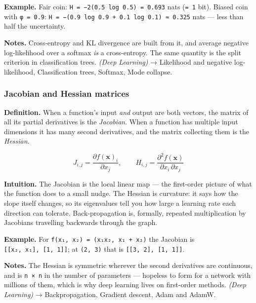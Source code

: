 \documentclass[
  10pt,
  letterpaper,
  onecolumn]{article}
\begin{document}
\textbf{Example.} Fair coin:
\texttt{H\ =\ −2(0.5\ log\ 0.5)\ =\ 0.693} nats
(\texttt{=\ 1} bit). Biased coin with \texttt{φ\ =\ 0.9}:
\texttt{H\ =\ −(0.9\ log\ 0.9\ +\ 0.1\ log\ 0.1)\ ≈\ 0.325} nats ---
less than half the uncertainty.

\textbf{Notes.} Cross-entropy and KL divergence are built from it, and
average negative log-likelihood over a softmax \emph{is} a
cross-entropy. The same quantity is the split criterion in
classification trees. \emph{(Deep Learning)} → Likelihood and negative
log-likelihood, Classification trees, Softmax, Mode collapse.

\hypertarget{jacobian-and-hessian-matrices}{%
\subsubsection{Jacobian and Hessian
matrices}\label{jacobian-and-hessian-matrices}}

\textbf{Definition.} When a function's input \emph{and} output are both
vectors, the matrix of all its partial derivatives is the
\emph{Jacobian}. When a function has multiple input dimensions it has
many second derivatives, and the matrix collecting them is the
\emph{Hessian}.

\begin{equation*}
J_{i,j}=\frac{\partial f(\mathbf{x})_i}{\partial x_j},
\qquad
H_{i,j}=\frac{\partial^{2} f(\mathbf{x})}{\partial x_i\,\partial x_j}
\end{equation*}

\textbf{Intuition.} The Jacobian is the local linear map --- the
first-order picture of what the function does to a small nudge. The
Hessian is curvature: it says how the slope itself changes, so its
eigenvalues tell you how large a learning rate each direction can
tolerate. Back-propagation is, formally, repeated multiplication by
Jacobians travelling backwards through the graph.

\textbf{Example.} For
\texttt{f(x₁,\ x₂)\ =\ (x₁x₂,\ x₁\ +\ x₂)} the Jacobian is
\texttt{{[}{[}x₂,\ x₁{]},\ {[}1,\ 1{]}{]}}; at \texttt{(2,\ 3)} that is
\texttt{{[}{[}3,\ 2{]},\ {[}1,\ 1{]}{]}}.

\textbf{Notes.} The Hessian is symmetric wherever the second derivatives
are continuous, and is \texttt{n\ ×\ n} in the number of parameters ---
hopeless to form for a network with millions of them, which is why deep
learning lives on first-order methods. \emph{(Deep Learning)} →
Backpropagation, Gradient descent, Adam and AdamW.
\end{document}
